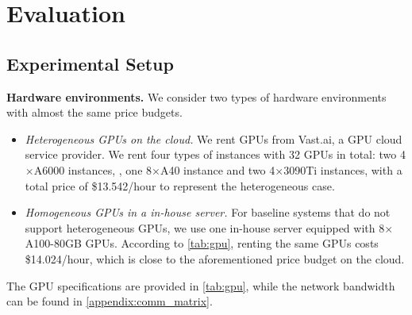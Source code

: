 \section{Evaluation}
\label{sec:eva}

\subsection{Experimental Setup}
\label{sec:eva_setup}
\noindent \textbf{Hardware environments.}
We consider two types of hardware environments with almost the same price budgets.
\begin{itemize}[topsep=0pt, leftmargin=*]
\item \textit{Heterogeneous GPUs on the cloud.} 
We rent GPUs from Vast.ai, a GPU cloud service provider. We rent four types of instances with 32 GPUs in total: two 4$\times$A6000 instances, , one 8$\times$A40 instance and two 4$\times$3090Ti instances, with a total price of \$13.542/hour to represent the heterogeneous case.
% 
\item \textit{Homogeneous GPUs in a in-house server.} 
For baseline systems that do not support heterogeneous GPUs, we use one in-house server equipped with 8$\times$A100-80GB GPUs. 
According to \autoref{tab:gpu}, renting the same GPUs costs \$14.024/hour, which is close to the aforementioned price budget on the cloud. 
\end{itemize}
% 
The GPU specifications are provided in \autoref{tab:gpu}, while the network bandwidth can be found in \autoref{appendix:comm_matrix}.


